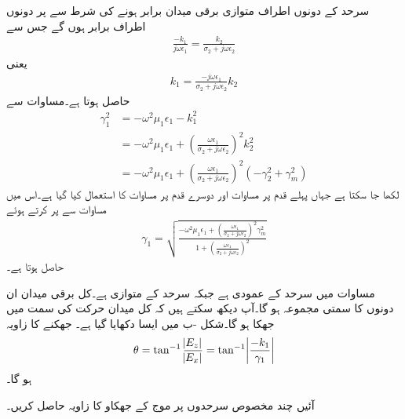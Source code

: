 سرحد کے دونوں اطراف متوازی برقی میدان برابر ہونے کی شرط سے  پر دونوں اطراف  برابر ہوں گے جس سے
\begin{align*}
\frac{-k_1}{j\omega \epsilon_1}=\frac{k_2}{\sigma_2+j\omega \epsilon_2}
\end{align*}
یعنی
\begin{align}\label{مساوات_مویج_سطحی_موج_مستقل_ت}
k_1=\frac{-j\omega \epsilon_1}{\sigma_2+j\omega \epsilon_2}k_2
\end{align}
حاصل ہوتا ہے۔مساوات  سے 
\begin{align*}
\gamma_1^2&=-\omega^2 \mu_1 \epsilon_1-k_1^2\\
&=-\omega^2 \mu_1 \epsilon_1+\left(\frac{\omega \epsilon_1}{\sigma_2+j\omega\epsilon_2}\right)^2 k_2^2\\
&=-\omega^2 \mu_1 \epsilon_1+\left(\frac{\omega \epsilon_1}{\sigma_2+j\omega\epsilon_2}\right)^2\left(-\gamma_2^2+\gamma_m^2 \right)
\end{align*}
لکھا جا سکتا ہے جہاں پہلے قدم پر مساوات  اور دوسرے قدم پر مساوات  کا استعمال کیا گیا ہے۔اس میں مساوات  سے  پر کرتے ہوئے
\begin{align}
\gamma_1=\sqrt{\frac{-\omega^2 \mu_1 \epsilon_1+\left(\frac{\omega \epsilon_1}{\sigma_2+j\omega\epsilon_2}\right)^2\gamma_m^2}{1+\left(\frac{\omega \epsilon_1}{\sigma_2+j\omega\epsilon_2}\right)^2}}
\end{align}
حاصل ہوتا ہے۔

مساوات  میں  سرحد کے عمودی ہے جبکہ  سرحد کے متوازی ہے۔کل برقی میدان ان دونوں کا سمتی مجموعہ ہو گا۔آپ دیکھ سکتے ہیں کہ کل میدان حرکت کی سمت میں جھکا ہو گا۔شکل -ب میں ایسا دکھایا گیا ہے۔ جھکنے کا زاویہ
\begin{align}
\theta=\tan^{-1} \frac{\abs{E_z}}{\abs{E_x}}=\tan^{-1}\abs{\frac{-k_1}{\gamma_1}}
\end{align}
ہو گا۔

آئیں چند مخصوص سرحدوں پر موج کے جھکاو کا زاویہ حاصل کریں۔

